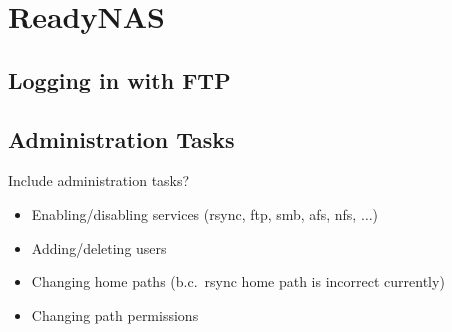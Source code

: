
\chapter{ReadyNAS}
\label{sec:op_readynas}


\section{Logging in with FTP}
\label{sec:op_readynas:ftp}

\section{Administration Tasks}

Include administration tasks?
\begin{itemize}
\item Enabling/disabling services (rsync, ftp, smb, afs, nfs, $\ldots$)
\item Adding/deleting users
\item Changing home paths (b.c.\ rsync home path is incorrect currently)
\item Changing path permissions
\end{itemize}


